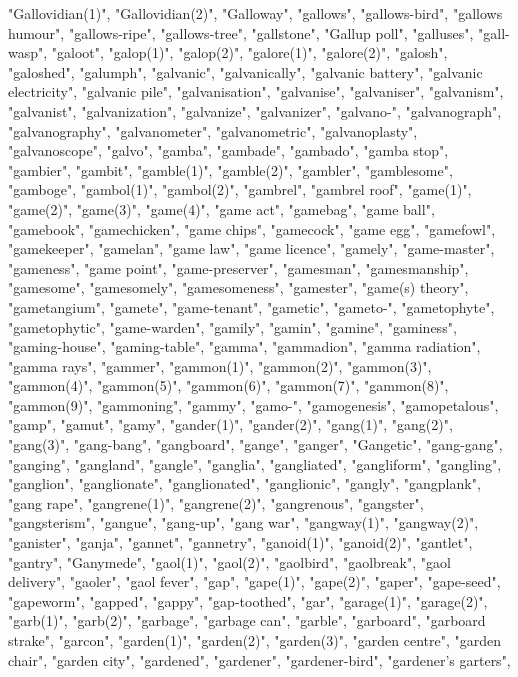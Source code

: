 "Gallovidian(1)",
"Gallovidian(2)",
"Galloway",
"gallows",
"gallows-bird",
"gallows humour",
"gallows-ripe",
"gallows-tree",
"gallstone",
"Gallup poll",
"galluses",
"gall-wasp",
"galoot",
"galop(1)",
"galop(2)",
"galore(1)",
"galore(2)",
"galosh",
"galoshed",
"galumph",
"galvanic",
"galvanically",
"galvanic battery",
"galvanic electricity",
"galvanic pile",
"galvanisation",
"galvanise",
"galvaniser",
"galvanism",
"galvanist",
"galvanization",
"galvanize",
"galvanizer",
"galvano-",
"galvanograph",
"galvanography",
"galvanometer",
"galvanometric",
"galvanoplasty",
"galvanoscope",
"galvo",
"gamba",
"gambade",
"gambado",
"gamba stop",
"gambier",
"gambit",
"gamble(1)",
"gamble(2)",
"gambler",
"gamblesome",
"gamboge",
"gambol(1)",
"gambol(2)",
"gambrel",
"gambrel roof",
"game(1)",
"game(2)",
"game(3)",
"game(4)",
"game act",
"gamebag",
"game ball",
"gamebook",
"gamechicken",
"game chips",
"gamecock",
"game egg",
"gamefowl",
"gamekeeper",
"gamelan",
"game law",
"game licence",
"gamely",
"game-master",
"gameness",
"game point",
"game-preserver",
"gamesman",
"gamesmanship",
"gamesome",
"gamesomely",
"gamesomeness",
"gamester",
"game(s) theory",
"gametangium",
"gamete",
"game-tenant",
"gametic",
"gameto-",
"gametophyte",
"gametophytic",
"game-warden",
"gamily",
"gamin",
"gamine",
"gaminess",
"gaming-house",
"gaming-table",
"gamma",
"gammadion",
"gamma radiation",
"gamma rays",
"gammer",
"gammon(1)",
"gammon(2)",
"gammon(3)",
"gammon(4)",
"gammon(5)",
"gammon(6)",
"gammon(7)",
"gammon(8)",
"gammon(9)",
"gammoning",
"gammy",
"gamo-",
"gamogenesis",
"gamopetalous",
"gamp",
"gamut",
"gamy",
"gander(1)",
"gander(2)",
"gang(1)",
"gang(2)",
"gang(3)",
"gang-bang",
"gangboard",
"gange",
"ganger",
"Gangetic",
"gang-gang",
"ganging",
"gangland",
"gangle",
"ganglia",
"gangliated",
"gangliform",
"gangling",
"ganglion",
"ganglionate",
"ganglionated",
"ganglionic",
"gangly",
"gangplank",
"gang rape",
"gangrene(1)",
"gangrene(2)",
"gangrenous",
"gangster",
"gangsterism",
"gangue",
"gang-up",
"gang war",
"gangway(1)",
"gangway(2)",
"ganister",
"ganja",
"gannet",
"gannetry",
"ganoid(1)",
"ganoid(2)",
"gantlet",
"gantry",
"Ganymede",
"gaol(1)",
"gaol(2)",
"gaolbird",
"gaolbreak",
"gaol delivery",
"gaoler",
"gaol fever",
"gap",
"gape(1)",
"gape(2)",
"gaper",
"gape-seed",
"gapeworm",
"gapped",
"gappy",
"gap-toothed",
"gar",
"garage(1)",
"garage(2)",
"garb(1)",
"garb(2)",
"garbage",
"garbage can",
"garble",
"garboard",
"garboard strake",
"garcon",
"garden(1)",
"garden(2)",
"garden(3)",
"garden centre",
"garden chair",
"garden city",
"gardened",
"gardener",
"gardener-bird",
"gardener's garters",
